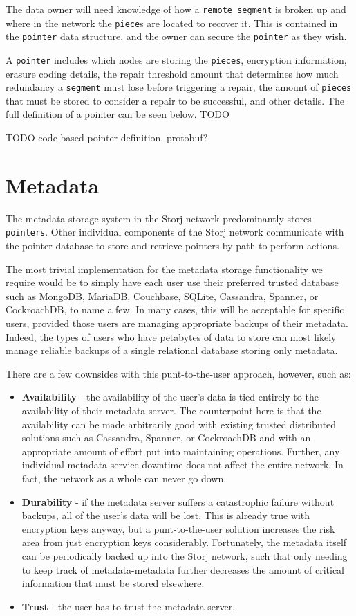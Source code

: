 \documentclass[11pt,fleqn,openany]{book}
\newcommand{\x}[1]{{\tt #1}} \newcommand{\code}[1]{{\em #1}}
\newcommand{\todo}[1]{{\color{red} TODO #1 }}
\begin{document}
The data owner will need knowledge of how a \x{remote segment} is broken up and
where in the network the \x{piece}s are located to recover it. This is contained
in the \x{pointer} data structure, and the owner can secure the \x{pointer} as
they wish.

A \x{pointer} includes which nodes are storing the \x{pieces},
encryption information, erasure coding details,
the repair threshold amount that determines how much redundancy a \x{segment}
must lose before triggering a repair, the amount of \x{pieces} that must be
stored to consider a repair to be successful, and other details. The full
definition of a pointer can be seen below. \todo{}

\todo{code-based pointer definition. protobuf?}

\section{Metadata}\label{sec:concrete-metadata}

The metadata storage system in the Storj network predominantly stores
\x{pointers}. Other individual components of the Storj network communicate with
the pointer database to store and retrieve pointers by path to perform actions.

The most trivial implementation for the metadata storage functionality we
require would be to simply have each user use their preferred trusted database
such as MongoDB, MariaDB, Couchbase, SQLite, Cassandra\cite{cassandra},
Spanner\cite{spanner}, or CockroachDB, to name a few. In many cases, this will
be acceptable for specific users, provided those users are managing appropriate
backups of their metadata. Indeed, the types of users who have petabytes of data
to store can most likely manage reliable backups of a single relational database
storing only metadata.

There are a few downsides with this punt-to-the-user approach, however, such as:
\begin{itemize}
\item {\bf Availability} - the availability of the user's data
is tied entirely to the availability of their metadata server. The counterpoint
here is that the availability can be made arbitrarily good with existing trusted
distributed solutions such as Cassandra, Spanner, or CockroachDB and with an
appropriate amount of effort put into maintaining operations. Further, any
individual metadata service downtime does not affect the entire network. In
fact, the network as a whole can never go down.
\item {\bf Durability} -
if the metadata server suffers a catastrophic failure without backups, all of
the user's data will be lost. This is already true with encryption keys anyway,
but a punt-to-the-user solution increases the risk area from just encryption
keys considerably. Fortunately, the metadata itself can be periodically backed
up into the Storj network,
such that only needing to keep track of metadata-metadata
further decreases the amount of critical information that must be stored
elsewhere.
\item {\bf Trust} - the user has to trust the metadata server.
\end{itemize}
\end{document}
